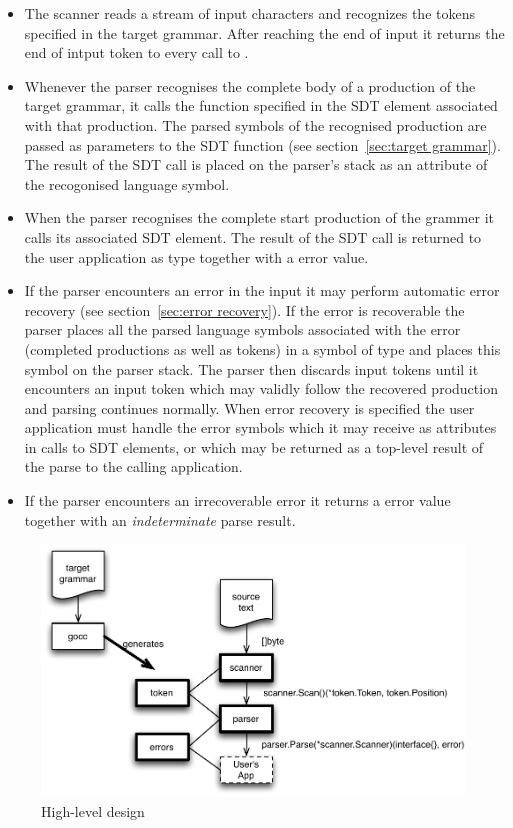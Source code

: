 \documentclass[12pt]{article}
\begin{document}
\begin{itemize}
		\item The scanner reads a stream of input characters and recognizes the tokens specified in the target grammar. After reaching the end of input it returns the end of intput token to every call to .

		\item Whenever the parser recognises the complete body of a production of the target grammar, it calls the function specified in the SDT element associated with that production. The parsed symbols of the recognised production are passed as parameters to the SDT function (see section~\ref{sec:target grammar}). The result of the SDT call is placed on the parser's stack as an attribute of the recogonised language symbol.

		\item When the parser recognises the complete start production of the grammer it calls its associated SDT element. The result of the SDT call is returned to the user application as type  together with a  error value.

		\item If the parser encounters an error in the input it may perform automatic error recovery (see section~\ref{sec:error recovery}). If the error is recoverable the parser places all the parsed language symbols associated with the error (completed productions as well as tokens) in a symbol of type  and places this symbol on the parser stack. The parser then discards input tokens until it encounters an input token which may validly follow the recovered production and parsing continues normally. When error recovery is specified the user application must handle the error symbols which it may receive as attributes in calls to SDT elements, or which may be returned as a top-level result of the parse to the calling application.

		\item If the parser encounters an irrecoverable error it returns a  error value together with an {\em indeterminate} parse result.
	\end{itemize}

	\begin{figure}
		\includegraphics[scale=1]{"hl_design"}
		\caption{High-level design}
		\label{fig:hl design}
	\end{figure}
\end{document}

